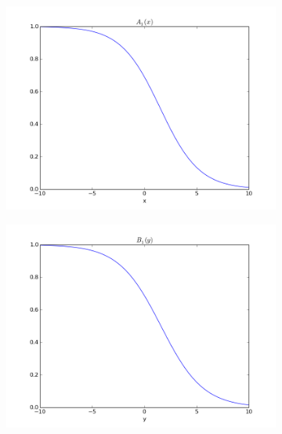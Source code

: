\documentclass[paper=a4, fontsize=11pt]{scrartcl} %
\numberwithin{equation}{section} %
\numberwithin{figure}{section} %
\numberwithin{table}{section} %
\begin{document}
\begin{figure}[h]
\centering
\begin{subfigure}[b]{0.45\textwidth}
\includegraphics[width=\textwidth]{img/figure_1.png}
\end{subfigure}
\begin{subfigure}[b]{0.45\textwidth}
\includegraphics[width=\textwidth]{img/figure_2.png}
\end{subfigure}


\end{figure}
\end{document}
